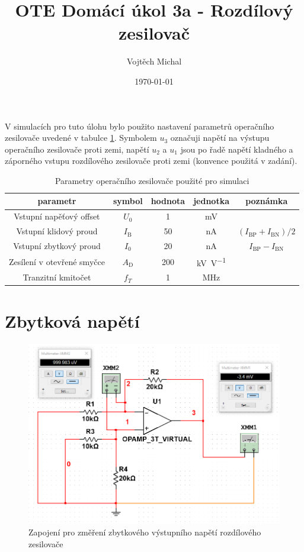 \documentclass[twoside]{article}
\title{OTE Domácí úkol 3a - Rozdílový zesilovač}
\author{Vojtěch Michal}
\date{\today}
\begin{document}
\maketitle

V simulacích pro tuto úlohu bylo použito nastavení parametrů operačního zesilovače uvedené v tabulce \ref{tab:oz_param}.
Symbolem $u_3$ označuji napětí na výstupu operačního zesilovače proti zemi,
napětí $u_2$ a $u_1$ jsou po řadě napětí kladného a záporného vstupu rozdílového zesilovače proti zemi
(konvence použitá v zadání).

\begin{table}[h!]
    \centering
    \begin{tabular}{c|c|c|c|c}
        parametr & symbol & hodnota & jednotka & poznámka\\
        \hline
        Vstupní napěťový offset & $U_0$ & 1 & \si{\milli\volt} & \\
        Vstupní klidový proud & $I_\text{B}$ & 50 & \si{\nano\ampere} & $(I_\text{BP} + I_\text{BN})/2$ \\
        Vstupní zbytkový proud & $I_0$ & 20 & \si{\nano\ampere} & $I_\text{BP} - I_\text{BN}$ \\
        Zesílení v otevřené smyčce & $A_\text{D}$ & 200 & \si{\kilo\volt\per\volt} & \\
        Tranzitní kmitočet& $f_T$ & 1 & \si{\mega\hertz} &
    \end{tabular}
    \caption{Parametry operačního zesilovače použité pro simulaci}
    \label{tab:oz_param}
\end{table}

\section{Zbytková napětí}

\begin{figure}[h!]
    \centering
    \includegraphics[width=0.5\linewidth]{rozdilovy_zbytkove_napeti.png}
    \caption{Zapojení pro změření zbytkového výstupního napětí rozdílového zesilovače}
    \label{fig:zbytkove_u}
\end{figure}
\end{document}
